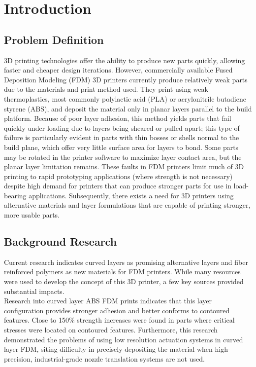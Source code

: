 \section{Introduction}

\subsection{Problem Definition}

\indent

3D printing technologies offer the ability to produce new parts quickly, allowing faster and cheaper design iterations. However, commercially available Fused Deposition Modeling (FDM) 3D printers currently produce relatively weak parts due to the materials and print method used. They print using weak thermoplastics, most commonly polylactic acid (PLA) or acrylonitrile butadiene styrene (ABS), and deposit the material only in planar layers parallel to the build platform. Because of poor layer adhesion, this method yields parts that fail quickly under loading due to layers being sheared or pulled apart; this type of failure is particularly evident in parts with thin bosses or shells normal to the build plane, which offer very little surface area for layers to bond. Some parts may be rotated in the printer software to maximize layer contact area, but the planar layer limitation remains. These faults in FDM printers limit much of 3D printing to rapid prototyping applications (where strength is not necessary) despite high demand for printers that can produce stronger parts for use in load-bearing applications. Subsequently, there exists a need for 3D printers using alternative materials and layer formulations that are capable of printing stronger, more usable parts.\\

\subsection{Background Research}

\indent

Current research indicates curved layers as promising alternative layers and fiber reinforced polymers as new materials for FDM printers. While many resources were used to develop the concept of this 3D printer, a few key sources provided substantial impacts.\\

Research into curved layer ABS FDM prints indicates that this layer configuration provides stronger adhesion and better conforms to contoured features. Close to 150\% strength increases were found in parts where critical stresses were located on contoured features. Furthermore, this research demonstrated the problems of using low resolution actuation systems in curved layer FDM, siting difficulty in precisely depositing the material when high-precision, industrial-grade nozzle translation systems are not used.\cite{cute-curves}\\

